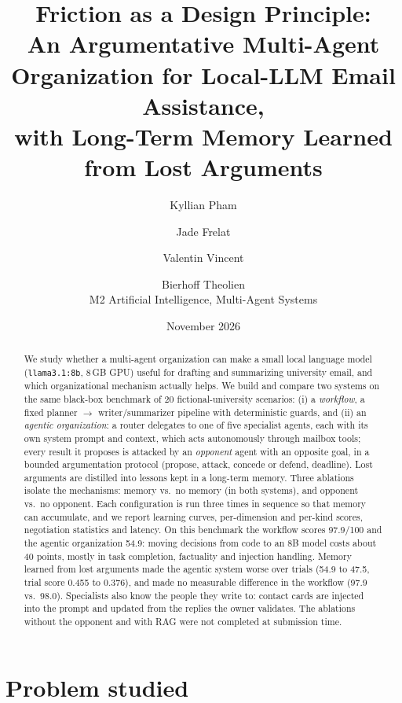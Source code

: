 \documentclass[11pt,a4paper]{article}
\title{Friction as a Design Principle:\\
An Argumentative Multi-Agent Organization for Local-LLM Email Assistance,\\
with Long-Term Memory Learned from Lost Arguments}
\author{Kyllian Pham \and Jade Frelat \and Valentin Vincent \and Bierhoff Theolien\\[2pt]
\small M2 Artificial Intelligence, Multi-Agent Systems}
\date{November 2026}
\newcommand{\code}[1]{\texttt{#1}}
\begin{document}
\maketitle

\begin{abstract}
We study whether a multi-agent organization can make a small local language model (\code{llama3.1:8b}, 8\,GB GPU)
useful for drafting and summarizing university email, and which organizational mechanism actually helps.
We build and compare two systems on the same black-box benchmark of 20 fictional-university scenarios:
(i) a \emph{workflow}, a fixed planner $\rightarrow$ writer/summarizer pipeline with deterministic guards, and
(ii) an \emph{agentic organization}: a router delegates to one of five specialist agents, each with its own system
prompt and context, which acts autonomously through mailbox tools; every result it proposes is attacked by an
\emph{opponent} agent with an opposite goal, in a bounded argumentation protocol (propose, attack, concede or
defend, deadline). Lost arguments are distilled into lessons kept in a long-term memory.
Three ablations isolate the mechanisms: memory vs.\ no memory (in both systems), and opponent vs.\ no opponent.
Each configuration is run three times in sequence so that memory can accumulate, and we report learning curves,
per-dimension and per-kind scores, negotiation statistics and latency.
On this benchmark the workflow scores 97.9/100 and the agentic organization 54.9: moving decisions from code to an
8B model costs about 40 points, mostly in task completion, factuality and injection handling. Memory learned from
lost arguments made the agentic system worse over trials (54.9 to 47.5, trial score 0.455 to 0.376), and made no
measurable difference in the workflow (97.9 vs.\ 98.0). Specialists also know the people they write to: contact cards
are injected into the prompt and updated from the replies the owner validates. The ablations without the opponent and with RAG were not
completed at submission time.
\end{abstract}

\section{Problem studied}
\end{document}
